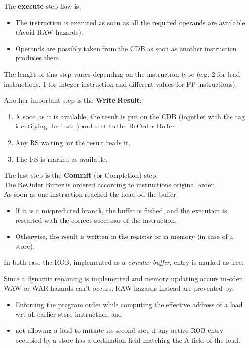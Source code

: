 \documentclass[12pt]{article}
\begin{document}
The \textbf{execute} step flow is:
\begin{itemize}
  \item The instruction is executed as soon as all the required operands are available (Avoid RAW hazards).
  \item Operands are possibly taken from the CDB as soon as another instruction produces them.
\end{itemize}
The lenght of this step varies depending on the instruction type (e.g. 2 for load instructions, 1 for integer instruction and different values for FP instructions).

Another important step is the \textbf{Write Result}:
\begin{enumerate}
  \item A soon as it is available, the result is put on the CDB (together with the tag identifying the instr.) and sent to the ReOrder Buffer.
  \item Any RS waiting for the result reads it.
  \item The RS is marked as available.
\end{enumerate}

The last step is the \textbf{Commit} (or Completion) step:\\
The ReOrder Buffer is ordered according to instructions original order.\\
As soon as one instruction reached the head od the buffer:
\begin{itemize}
  \item If it is a mispredicted branch, the buffer is flished, and the execution is restarted with the correct successor of the instruction.
  \item Otherwise, the result is written in the register or in memory (in case of a store).
\end{itemize}
In both case the ROB, implemented as a \textit{circular buffer}, entry is marked as free.

Since a dynamic renaming is implemented and memory updating occurs in-oder WAW or WAR hazards can't occurs. RAW hazards instead are prevented by:
\begin{itemize}
  \item Enforcing the program order while computing the effective address of a load wrt all earlier store instruction, and
  \item not allowing a load to initiate its second step if any active ROB entry occupied by a store has a destination field matching the A field of the load.
\end{itemize}
\end{document}

